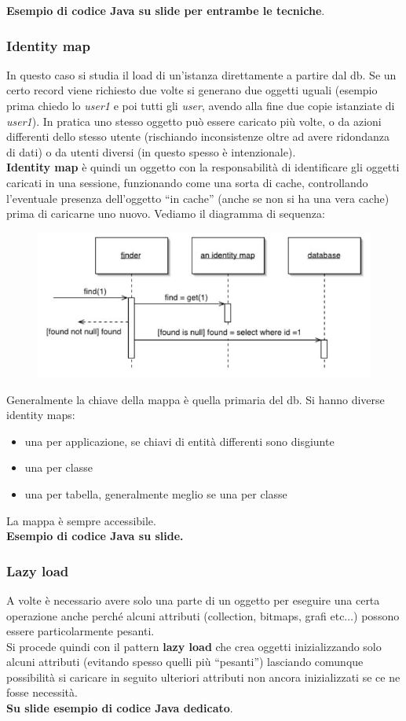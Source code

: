 \documentclass[a4paper,12pt, oneside]{book}
\begin{document}
\textbf{Esempio di codice Java su slide per entrambe le tecniche}.\\

\subsubsection{Identity map}
In questo caso si studia il load di un'istanza direttamente a partire dal
db. Se un certo record viene richiesto due volte si generano due oggetti uguali
(esempio prima chiedo lo \textit{user1} e poi tutti gli \textit{user}, avendo
alla fine due copie istanziate di \textit{user1}). In pratica uno stesso oggetto
può essere caricato più volte, o da azioni differenti dello stesso utente
(rischiando inconsistenze oltre ad avere ridondanza di dati) o da utenti diversi
(in questo spesso è intenzionale).\\
\textbf{Identity map} è quindi un oggetto con la responsabilità di identificare
gli oggetti caricati in una sessione, funzionando come una sorta di cache,
controllando l'eventuale presenza dell'oggetto ``in cache'' (anche se non si ha
una vera cache) prima di caricarne uno nuovo. Vediamo il diagramma di sequenza:
\begin{figure}[H]
  \centering
  \includegraphics[scale = 0.4]{img/im.jpg}
\end{figure}
Generalmente la chiave della mappa è quella primaria del db. Si hanno diverse
identity maps:
\begin{itemize}
  \item una per applicazione, se chiavi di entità differenti sono disgiunte
  \item una per classe
  \item una per tabella, generalmente meglio se una per classe
\end{itemize}
La mappa è sempre accessibile.\\
\textbf{Esempio di codice Java su slide.}
\subsubsection{Lazy load}
A volte è necessario avere solo una parte di un oggetto per eseguire una certa
operazione anche perché alcuni attributi (collection, bitmaps, grafi
etc$\ldots$) possono essere particolarmente pesanti.\\
Si procede quindi con il pattern \textbf{lazy load} che crea oggetti
inizializzando solo alcuni attributi (evitando spesso quelli più ``pesanti'')
lasciando comunque possibilità si caricare in seguito ulteriori attributi non
ancora inizializzati se ce ne fosse necessità.\\
\textbf{Su slide esempio di codice Java dedicato}.
\end{document}
